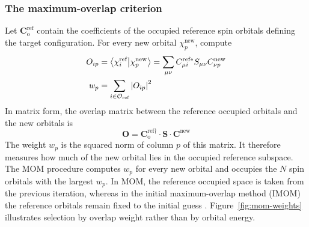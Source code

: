 \documentclass[11pt,a4paper,titlepage]{article}
\numberwithin{equation}{section}
\newcommand{\bC}{\boldsymbol{C}}
\newcommand{\bS}{\boldsymbol{S}}
\begin{document}
\subsubsection{The maximum-overlap criterion}

Let $\bC_\text{o}^\text{ref}$ contain the coefficients of the occupied
reference spin orbitals defining the target configuration. For every new
orbital $\chi_p^\text{new}$, compute
\begin{equation}
\begin{split}
  O_{ip}
  &=\braket{\chi_i^\text{ref}}{\chi_p^\text{new}}
  =\sum_{\mu\nu}C_{\mu i}^{\text{ref}*}
    S_{\mu\nu}C_{\nu p}^\text{new}
  \\
  w_p&=\sum_{i\in\mathcal{O}_\text{ref}}\abs{O_{ip}}^2
\end{split}
\end{equation}
In matrix form, the overlap matrix between the reference occupied orbitals and
the new orbitals is
\begin{equation}
  \boldsymbol{O}
  =
  \bC_\text{o}^{\text{ref}\dagger}
  \cdot\bS\cdot
  \bC^\text{new}
\end{equation}
The weight $w_p$ is the squared norm of column $p$ of this matrix. It therefore
measures how much of the new orbital lies in the occupied reference subspace.
The MOM procedure computes $w_p$ for every new orbital and occupies the $N$
spin orbitals with the largest $w_p$. In MOM, the reference occupied
space is taken from the previous iteration, whereas in the initial
maximum-overlap method (IMOM) the
reference orbitals remain fixed to the initial guess \citep{Barca2018}.
Figure~\ref{fig:mom-weights} illustrates selection by overlap weight
rather than by orbital energy.
\end{document}
